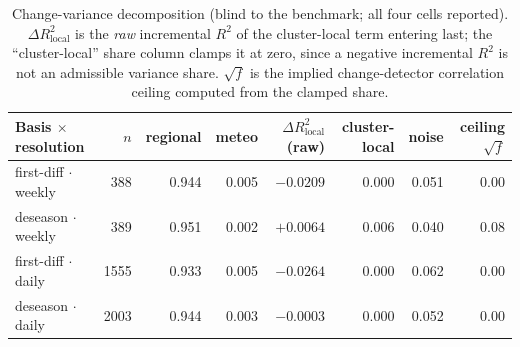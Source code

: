 \documentclass[11pt,a4paper]{article}
\begin{document}
\begin{table}[t]
\centering
\caption{Change-variance decomposition (blind to the benchmark; all four cells reported).
$\Delta R^2_{\text{local}}$ is the \emph{raw} incremental $R^2$ of the cluster-local term entering
last; the ``cluster-local'' share column clamps it at zero, since a negative incremental $R^2$ is
not an admissible variance share. $\surd f$ is the implied change-detector correlation ceiling
computed from the clamped share.}
\label{tab:variance}
\small
\begin{tabular}{lrrrrrrr}
\toprule
Basis $\times$ resolution & $n$ & regional & meteo & $\Delta R^2_{\text{local}}$ (raw)
& cluster-local & noise & ceiling $\surd f$ \\
\midrule
first-diff $\cdot$ weekly & 388  & 0.944 & 0.005 & $-0.0209$ & 0.000 & 0.051 & 0.00 \\
deseason $\cdot$ weekly   & 389  & 0.951 & 0.002 & $+0.0064$ & 0.006 & 0.040 & 0.08 \\
first-diff $\cdot$ daily  & 1555 & 0.933 & 0.005 & $-0.0264$ & 0.000 & 0.062 & 0.00 \\
deseason $\cdot$ daily    & 2003 & 0.944 & 0.003 & $-0.0003$ & 0.000 & 0.052 & 0.00 \\
\bottomrule
\end{tabular}
\end{table}
\end{document}
